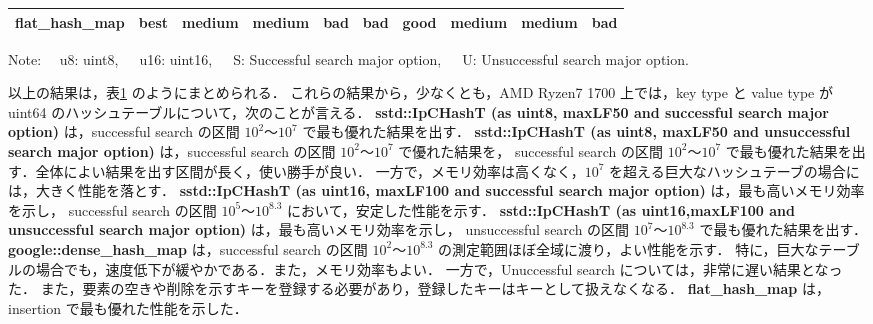 \begin{table}
\begin{center}
\begin{tabular}{c|c|ccc|ccc|c|c}
        flat\_hash\_map        & \cellcolor{cBest}best & \cellcolor{cMedi}medium & \cellcolor{cMedi}medium & \cellcolor{cBad }bad    & \cellcolor{cBad }bad    & \cellcolor{cGood}good   & \cellcolor{cMedi}medium  & \cellcolor{cMedi}medium & \cellcolor{cBad }bad  \rule[0pt]{0pt}{15pt} \\ \hline
    \end{tabular}
    Note: \ \ u8: uint8,\ \ \ u16: uint16,\ \ \ S: Successful search major option,\ \ \ U: Unsuccessful search major option.
    \label{table_hashT_cmp}
  \end{center}
\end{table}

以上の結果は，表\ref{table_hashT_cmp} のようにまとめられる．
これらの結果から，少なくとも，AMD Ryzen7 1700 上では，key type と value type が uint64 のハッシュテーブルについて，次のことが言える．
{\bf sstd::IpCHashT (as uint8, maxLF50 and successful search major option)} は，successful search の区間 $10^2〜10^7$ で最も優れた結果を出す．
{\bf sstd::IpCHashT (as uint8, maxLF50 and unsuccessful search major option)} は，successful search の区間 $10^2〜10^7$ で優れた結果を，
successful search の区間 $10^2〜10^7$ で最も優れた結果を出す．全体によい結果を出す区間が長く，使い勝手が良い．
一方で，メモリ効率は高くなく，$10^7$ を超える巨大なハッシュテーブの場合には，大きく性能を落とす．
{\bf sstd::IpCHashT (as uint16, maxLF100 and successful search major option)} は，最も高いメモリ効率を示し，
successful search の区間 $10^5〜10^8.3$ において，安定した性能を示す．
{\bf sstd::IpCHashT (as uint16,maxLF100 and unsuccessful search major option)} は，最も高いメモリ効率を示し，
unsuccessful search の区間 $10^7〜10^8.3$ で最も優れた結果を出す．
{\bf google::dense\_hash\_map} は，successful search の区間 $10^2〜10^8.3$ の測定範囲ほぼ全域に渡り，よい性能を示す．
特に，巨大なテーブルの場合でも，速度低下が緩やかである．また，メモリ効率もよい．
一方で，Unuccessful search については，非常に遅い結果となった．
また，要素の空きや削除を示すキーを登録する必要があり，登録したキーはキーとして扱えなくなる．
{\bf flat\_hash\_map} は，insertion で最も優れた性能を示した．






